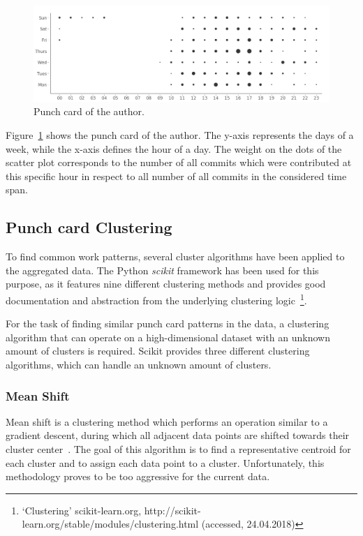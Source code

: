 \begin{figure}[h]
    \includegraphics[scale=0.32]{./graphs/analysis/ordered-punchcard}
    \centering
    \caption{Punch card of the author.}\label{fig:working-hour-rhythm-author}
\end{figure}

Figure~\ref{fig:working-hour-rhythm-author} shows the punch card of the author.
The y-axis represents the days of a week, while the x-axis defines the hour of a day.
The weight on the dots of the scatter plot corresponds to the number of all commits which were contributed at this specific hour in respect to all number of all commits in the considered time span.


\subsection{Punch card Clustering}

To find common work patterns, several cluster algorithms have been applied to the aggregated data.
The Python \emph{scikit} framework has been used for this purpose, as it features nine different clustering methods and provides good documentation and abstraction from the underlying clustering logic~\footnote{`Clustering' scikit-learn.org, http://scikit-learn.org/stable/modules/clustering.html (accessed, 24.04.2018)}.

For the task of finding similar punch card patterns in the data, a clustering algorithm that can operate on a high-dimensional dataset with an unknown amount of clusters is required.
Scikit provides three different clustering algorithms, which can handle an unknown amount of clusters.

\subsubsection{Mean Shift}\label{mean-shift}
Mean shift is a clustering method which performs an operation similar to a gradient descent, during which all adjacent data points are shifted towards their cluster center~\cite{article:mean-shift}.
The goal of this algorithm is to find a representative centroid for each cluster and to assign each data point to a cluster.
Unfortunately, this methodology proves to be too aggressive for the current data.

